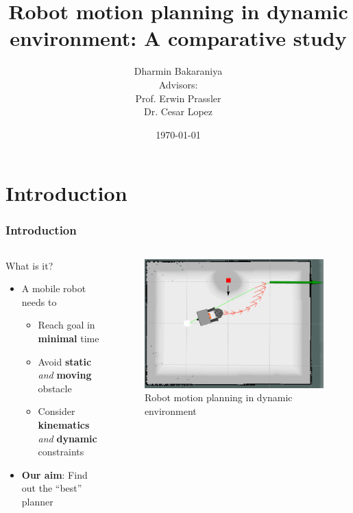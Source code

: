 \documentclass{beamer}
\title{Robot motion planning in dynamic environment: A comparative study}
\author{Dharmin Bakaraniya\\Advisors:\\Prof. Erwin Prassler\\Dr. Cesar Lopez}
\institute{Hochschule Bonn-Rhein-Sieg}
\date{\today}
\begin{document}
\begin{frame}
    \titlepage{}
\end{frame}


\section{Introduction}
\begin{frame}
    \frametitle{\huge{Introduction}}
    \begin{columns}[t]
        \begin{block}{What is it?}
            \begin{itemize}
                \item A mobile robot needs to 
                    \begin{itemize}
                        \item Reach goal in \textbf{minimal} time
                        \item Avoid \textbf{static} \textit{and} \textbf{moving} obstacle
                        \item Consider \textbf{kinematics} \textit{and} \textbf{dynamic} 
                            constraints
                    \end{itemize}
                \item \textbf{Our aim}: Find out the ``best'' planner
            \end{itemize}
        \end{block}
        \begin{figure}[htpb]
            \centering
            \includegraphics[width=1.0\textwidth]{intro.png}
            \caption{Robot motion planning in dynamic environment}
            \label{fig:intro}
        \end{figure}
    \end{columns}
\end{frame}
\end{document}
